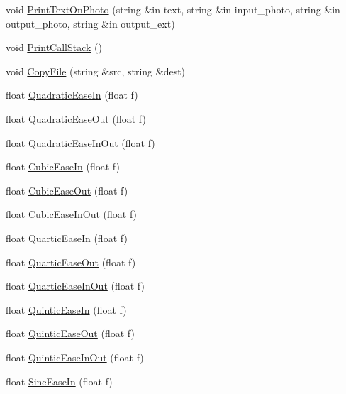 \begin{DoxyCompactItemize}
\item 
void \hyperlink{class_scene_script_core_utils_a64328eb589865efe2bf2703782fc2d3e}{Print\+Text\+On\+Photo} (string \&in text, string \&in input\+\_\+photo, string \&in output\+\_\+photo, string \&in output\+\_\+ext)
\item 
void \hyperlink{class_scene_script_core_utils_af8ac8f7da38488059e7d927b48be5547}{Print\+Call\+Stack} ()
\item 
void \hyperlink{class_scene_script_core_utils_af4dece532f9b58b4ee70065ebfa4f103}{Copy\+File} (string \&src, string \&dest)
\item 
float \hyperlink{class_scene_script_core_utils_ad6b11465209bf1918e3ac3801cb6fad0}{Quadratic\+Ease\+In} (float f)
\item 
float \hyperlink{class_scene_script_core_utils_aad772d9017b7e90b52437a80d0b7bde2}{Quadratic\+Ease\+Out} (float f)
\item 
float \hyperlink{class_scene_script_core_utils_ae9c379d922a3ce3aed2bb730484ed61d}{Quadratic\+Ease\+In\+Out} (float f)
\item 
float \hyperlink{class_scene_script_core_utils_a4a27dda78eaf15cc5a8eb00d5d7ea47b}{Cubic\+Ease\+In} (float f)
\item 
float \hyperlink{class_scene_script_core_utils_a2189f157a31e5066f6c2265b769020b9}{Cubic\+Ease\+Out} (float f)
\item 
float \hyperlink{class_scene_script_core_utils_a1b741fa9594e600a7ed5e3d08882a71f}{Cubic\+Ease\+In\+Out} (float f)
\item 
float \hyperlink{class_scene_script_core_utils_acd66bd8fd1a489bc7fe0abaaca747905}{Quartic\+Ease\+In} (float f)
\item 
float \hyperlink{class_scene_script_core_utils_ac894794c65bc4f0b27858ad332bce270}{Quartic\+Ease\+Out} (float f)
\item 
float \hyperlink{class_scene_script_core_utils_aff8241e270c91be029c84625778930ff}{Quartic\+Ease\+In\+Out} (float f)
\item 
float \hyperlink{class_scene_script_core_utils_aca6a4436737260472795aac82f24e259}{Quintic\+Ease\+In} (float f)
\item 
float \hyperlink{class_scene_script_core_utils_a09f96835e68c2c96edb9f87f89b5b140}{Quintic\+Ease\+Out} (float f)
\item 
float \hyperlink{class_scene_script_core_utils_a9c45ec7052f797248fb236327448f10d}{Quintic\+Ease\+In\+Out} (float f)
\item 
float \hyperlink{class_scene_script_core_utils_a13bf904dd97db82b63493ff762c59138}{Sine\+Ease\+In} (float f)

\end{DoxyCompactItemize}
